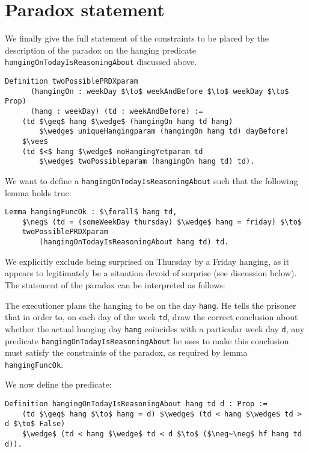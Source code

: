 \documentclass[runningheads]{llncs}
\newenvironment{myindent}{\begin{adjustwidth}{1cm}{}}{\end{adjustwidth}}
\begin{document}
\section{Paradox statement}
\label{sec:constraints}

We finally give the full statement of the constraints to be placed by the description of the paradox on the
hanging predicate {\tt hangingOnTodayIsReasoningAbout} discussed above.

\begin{lstlisting}[mathescape=true]
  Definition twoPossiblePRDXparam
      (hangingOn : weekDay $\to$ weekAndBefore $\to$ weekDay $\to$ Prop)
      (hang : weekDay) (td : weekAndBefore) :=
    (td $\geq$ hang $\wedge$ (hangingOn hang td hang)
        $\wedge$ uniqueHangingparam (hangingOn hang td) dayBefore)
    $\vee$
    (td $<$ hang $\wedge$ noHangingYetparam td
        $\wedge$ twoPossibleparam (hangingOn hang td) td).
\end{lstlisting}

We want to define a {\tt hangingOnTodayIsReasoningAbout} such that
the following lemma holds true:

\begin{lstlisting}[mathescape=true]
Lemma hangingFuncOk : $\forall$ hang td,
    $\neg$ (td = (someWeekDay thursday) $\wedge$ hang = friday) $\to$
    twoPossiblePRDXparam
        (hangingOnTodayIsReasoningAbout hang td) td.
\end{lstlisting}

We explicitly exclude being surprised
on Thursday by a Friday hanging, as it appears to legitimately be a situation devoid
of surprise (see discussion below).
The statement of the paradox can be interpreted as follows: \newline

\begin{myindent}
  The executioner plans the hanging to be on the
  day {\tt hang}. He tells the prisoner that in order to, on each day of the week {\tt td},
  draw the correct conclusion about whether the actual hanging day {\tt hang} coincides with a
  particular week day {\tt d}, any predicate {\tt hangingOnTodayIsReasoningAbout}
  he uses to make this conclusion
  must satisfy the constraints of the paradox, as required by lemma {\tt hangingFuncOk}. \newline
\end{myindent}

 We now define the predicate:

\begin{lstlisting}[mathescape=true]
  Definition hangingOnTodayIsReasoningAbout hang td d : Prop :=
    (td $\geq$ hang $\to$ hang = d) $\wedge$ (td < hang $\wedge$ td > d $\to$ False)
    $\wedge$ (td < hang $\wedge$ td < d $\to$ ($\neg~\neg$ hf hang td d)).
\end{lstlisting}
\end{document}
